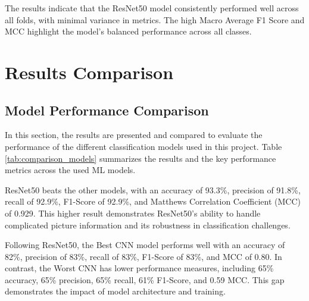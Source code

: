 \documentclass[conference]{IEEEtran}
\begin{document}
The results indicate that the ResNet50 model consistently performed well across all folds, with minimal variance in metrics. The high Macro Average F1 Score and \ac{MCC} highlight the model's balanced performance across all classes.

\section{Results Comparison}
\label{sec:results}



\subsection{Model Performance Comparison}
In this section, the results are presented and compared to evaluate the performance of the different classification models used in this project. Table \ref{tab:comparison_models} summarizes the results and the key performance metrics across the used \ac{ML} models.

ResNet50 beats the other models, with an accuracy of 93.3\%, precision of 91.8\%, recall of 92.9\%, F1-Score of 92.9\%, and Matthews Correlation Coefficient (\ac{MCC}) of 0.929. This higher result demonstrates ResNet50's ability to handle complicated picture information and its robustness in classification challenges.

Following ResNet50, the Best \ac{CNN} model performs well with an accuracy of 82\%, precision of 83\%, recall of 83\%, F1-Score of 83\%, and \ac{MCC} of 0.80. In contrast, the Worst CNN has lower performance measures, including 65\% accuracy, 65\% precision, 65\% recall, 61\% F1-Score, and 0.59 \ac{MCC}. This gap demonstrates the impact of model architecture and training.
\end{document}
